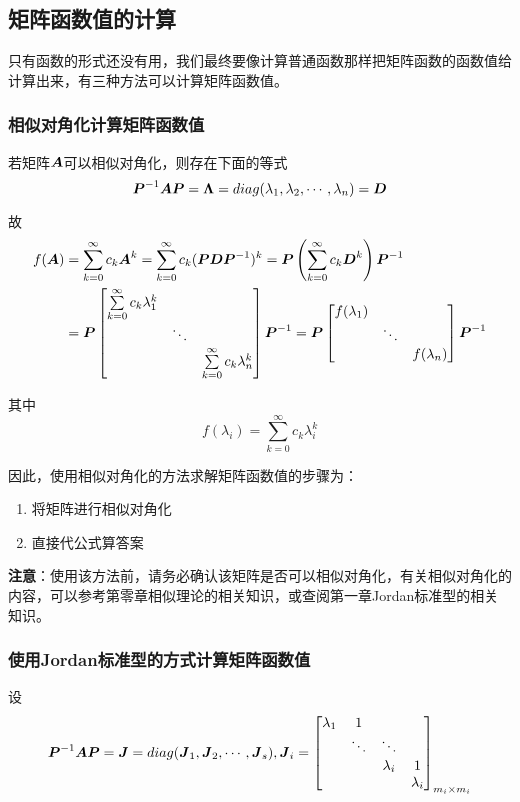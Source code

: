 \documentclass[12pt, a4paper, oneside, UTF8]{ctexbook}
\begin{document}
\subsection{矩阵函数值的计算}
只有函数的形式还没有用，我们最终要像计算普通函数那样把矩阵函数的函数值给计算出来，有三种方法可以计算矩阵函数值。
\subsubsection{相似对角化计算矩阵函数值}
若矩阵$\boldsymbol{A}$可以相似对角化，则存在下面的等式\[\boldsymbol{P}^{-1}\boldsymbol{A}\boldsymbol{P}=\boldsymbol{\Lambda}=diag(\lambda_1, \lambda_2, \cdots,\lambda_n)=\boldsymbol{D}\]

故\[\begin{aligned}
    f(\boldsymbol{A})&=\sum_{k=0}^{\infty}c_k\boldsymbol{A}^k=\sum_{k=0}^{\infty}c_k(\boldsymbol{P}\boldsymbol{D}\boldsymbol{P}^{-1})^k=\boldsymbol{P}\left(\sum_{k=0}^{\infty}c_k\boldsymbol{D}^k\right)\boldsymbol{P}^{-1}\\
    &=\boldsymbol{P}\begin{bmatrix}
        \sum\limits_{k=0}^{\infty}c_k\lambda_1^k&&\\
        &\ddots&\\
        &&\sum\limits_{k=0}^{\infty}c_k\lambda_n^k
    \end{bmatrix}\boldsymbol{P}^{-1}
    =\boldsymbol{P}\begin{bmatrix}
        f(\lambda_1)&&\\
        &\ddots&\\
        &&f(\lambda_n)
    \end{bmatrix}\boldsymbol{P}^{-1}
\end{aligned}\]

其中\[f(\lambda_i)=\sum_{k=0}^{\infty}c_k\lambda_i^k\]

因此，使用相似对角化的方法求解矩阵函数值的步骤为：
\begin{enumerate}[leftmargin=4em]
    \item 将矩阵进行相似对角化
    \item 直接代公式算答案
\end{enumerate}
\textbf{注意}：使用该方法前，请务必确认该矩阵是否可以相似对角化，有关相似对角化的内容，可以参考第零章相似理论的相关知识，或查阅第一章Jordan标准型的相关知识。

\subsubsection{使用Jordan标准型的方式计算矩阵函数值}
设\[\boldsymbol{P}^{-1}\boldsymbol{A}\boldsymbol{P}=\boldsymbol{J}=diag(\boldsymbol{J}_1, \boldsymbol{J}_2,\cdots,\boldsymbol{J}_s),\boldsymbol{J}_i=\begin{bmatrix}
    \lambda_1&1&&\\
    &\ddots&\ddots&\\
    &&\lambda_i&1\\
    &&&\lambda_i
\end{bmatrix}_{m_i\times m_i}\]
\end{document}
